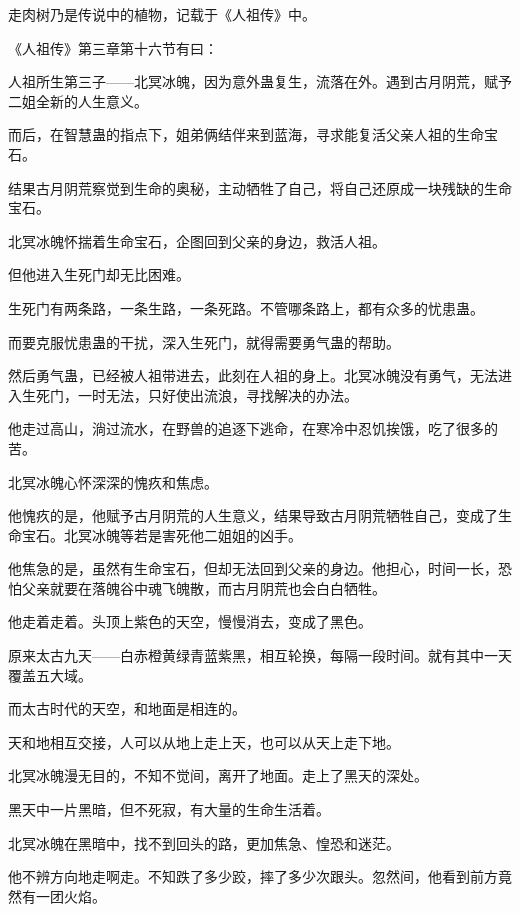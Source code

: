 
\begin{this_body}



走肉树乃是传说中的植物，记载于《人祖传》中。

《人祖传》第三章第十六节有曰：

人祖所生第三子——北冥冰魄，因为意外蛊复生，流落在外。遇到古月阴荒，赋予二姐全新的人生意义。

而后，在智慧蛊的指点下，姐弟俩结伴来到蓝海，寻求能复活父亲人祖的生命宝石。

结果古月阴荒察觉到生命的奥秘，主动牺牲了自己，将自己还原成一块残缺的生命宝石。

北冥冰魄怀揣着生命宝石，企图回到父亲的身边，救活人祖。

但他进入生死门却无比困难。

生死门有两条路，一条生路，一条死路。不管哪条路上，都有众多的忧患蛊。

而要克服忧患蛊的干扰，深入生死门，就得需要勇气蛊的帮助。

然后勇气蛊，已经被人祖带进去，此刻在人祖的身上。北冥冰魄没有勇气，无法进入生死门，一时无法，只好使出流浪，寻找解决的办法。

他走过高山，淌过流水，在野兽的追逐下逃命，在寒冷中忍饥挨饿，吃了很多的苦。

北冥冰魄心怀深深的愧疚和焦虑。

他愧疚的是，他赋予古月阴荒的人生意义，结果导致古月阴荒牺牲自己，变成了生命宝石。北冥冰魄等若是害死他二姐姐的凶手。

他焦急的是，虽然有生命宝石，但却无法回到父亲的身边。他担心，时间一长，恐怕父亲就要在落魄谷中魂飞魄散，而古月阴荒也会白白牺牲。

他走着走着。头顶上紫色的天空，慢慢消去，变成了黑色。

原来太古九天——白赤橙黄绿青蓝紫黑，相互轮换，每隔一段时间。就有其中一天覆盖五大域。

而太古时代的天空，和地面是相连的。

天和地相互交接，人可以从地上走上天，也可以从天上走下地。

北冥冰魄漫无目的，不知不觉间，离开了地面。走上了黑天的深处。

黑天中一片黑暗，但不死寂，有大量的生命生活着。

北冥冰魄在黑暗中，找不到回头的路，更加焦急、惶恐和迷茫。

他不辨方向地走啊走。不知跌了多少跤，摔了多少次跟头。忽然间，他看到前方竟然有一团火焰。


\end{this_body}
